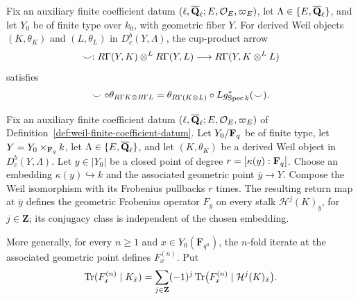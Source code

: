 \begin{proposition}
\label{prop:weil-cup-product-compatibility}


Fix an auxiliary finite coefficient datum
\((\ell,\overline{\mathbf Q}_\ell;E,\mathcal O_E,\varpi_E)\), let \(\Lambda\in\{E,\overline{\mathbf Q}_\ell\}\),
and let \(Y_0\) be of finite type over \(k_0\), with geometric fiber
\(Y\).  For derived Weil objects \((K,\theta_K)\) and
\((L,\theta_L)\) in \(D^b_c(Y,\Lambda)\), the cup-product arrow
\[
 \smile:R\Gamma(Y,K)\otimes^LR\Gamma(Y,L)
 \longrightarrow R\Gamma(Y,K\otimes^LL)
\]
satisfies
\[
 \smile\circ\theta_{R\Gamma K\otimes R\Gamma L}
 =\theta_{R\Gamma(K\otimes L)}\circ Lg_{\operatorname{Spec} k}^*(\smile).
\]
\end{proposition}


\begin{definition}
\label{def:local-frobenius-trace}


Fix an auxiliary finite coefficient datum
\((\ell,\overline{\mathbf Q}_\ell;E,\mathcal O_E,\varpi_E)\) of
Definition~\ref{def:weil-finite-coefficient-datum}.  Let \(Y_0/\mathbf F_q\) be
of finite type, let \(Y=Y_0\times_{\mathbf F_q}k\), let
\(\Lambda\in\{E,\overline{\mathbf Q}_\ell\}\), and let \((K,\theta_K)\) be a derived Weil
object in \(D^b_c(Y,\Lambda)\).  Let \(y\in|Y_0|\) be a closed point of degree
\(r=[\kappa(y):\mathbf F_q]\).  Choose an embedding
\(\kappa(y)\hookrightarrow k\) and the associated geometric point
\(\bar y\to Y\).  Compose the Weil isomorphism with its Frobenius pullbacks
\(r\) times.  The resulting return map at \(\bar y\) defines the geometric
Frobenius operator
\(F_y\) on every stalk
\(\mathcal H^j(K)_{\bar y}\), for \(j\in\mathbf Z\); its conjugacy class is
independent of the chosen embedding.

More generally, for every \(n\geq1\) and
\(x\in Y_0(\mathbf F_{q^n})\), the \(n\)-fold iterate
at the associated geometric point defines \(F_x^{(n)}\).  Put
\[
 \operatorname{Tr}(F_x^{(n)}\mid K_{\bar x})=
 \sum_{j\in\mathbf Z}(-1)^j
 \operatorname{Tr}\bigl(F_x^{(n)}\mid
 \mathcal H^j(K)_{\bar x}\bigr).
\]
\end{definition}


